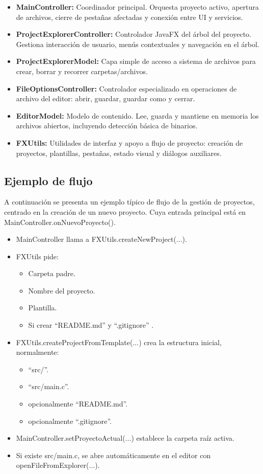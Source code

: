 \documentclass[../../main.tex]{subfiles}
\begin{document}
\begin{itemize}
    \item \textbf{MainController:} Coordinador principal. Orquesta proyecto activo, apertura de archivos, cierre de pestañas afectadas y conexión entre UI y servicios.
    \item \textbf{ProjectExplorerController:} Controlador JavaFX del árbol del proyecto. Gestiona interacción de usuario, menús contextuales y navegación en el árbol.
    \item \textbf{ProjectExplorerModel:} Capa simple de acceso a sistema de archivos para crear, borrar y recorrer carpetas/archivos.
    \item \textbf{FileOptionsController:} Controlador especializado en operaciones de archivo del editor: abrir, guardar, guardar como y cerrar.
    \item \textbf{EditorModel:} Modelo de contenido. Lee, guarda y mantiene en memoria los archivos abiertos, incluyendo detección básica de binarios.
    \item \textbf{FXUtils:} Utilidades de interfaz y apoyo a flujo de proyecto: creación de proyectos, plantillas, pestañas, estado visual y diálogos auxiliares.
\end{itemize}

\subsection{Ejemplo de flujo}

A continuación se presenta un ejemplo típico de flujo de la gestión de proyectos, centrado en la creación de un nuevo proyecto. Cuya entrada principal está en MainController.onNuevoProyecto().



\begin{itemize}
    \item MainController llama a FXUtils.createNewProject(...).
    \item FXUtils pide:
    \begin{itemize}
        \item Carpeta padre.
        \item Nombre del proyecto.
        \item Plantilla.
        \item Si crear ``README.md'' y ``.gitignore'' .
    \end{itemize}
    \item FXUtils.createProjectFromTemplate(...) crea la estructura inicial, normalmente:
    \begin{itemize}
        \item ``src/''.
        \item ``src/main.c''.
        \item opcionalmente ``README.md''.
        \item opcionalmente ``.gitignore''.
    \end{itemize}
    \item MainController.setProyectoActual(...) establece la carpeta raíz activa.
    \item Si existe src/main.c, se abre automáticamente en el editor con openFileFromExplorer(...).
\end{itemize}
\end{document}
